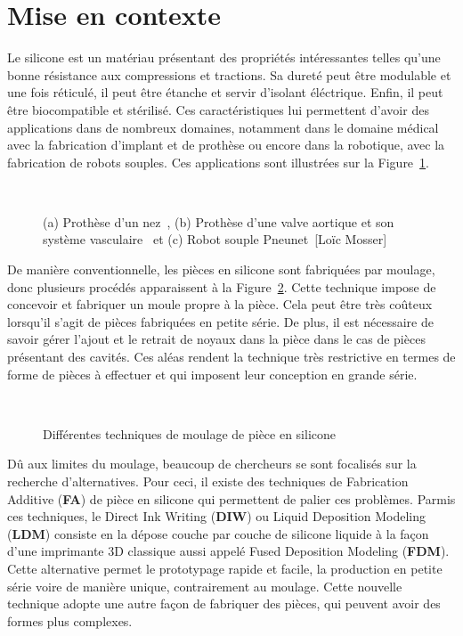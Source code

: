 \documentclass[11pt,a4paper]{article}
\begin{document}
\section*{Mise en contexte}
    Le silicone est un matériau présentant des propriétés intéressantes telles qu'une bonne résistance aux compressions et tractions. Sa dureté peut être modulable et une fois réticulé, il peut être étanche et servir d'isolant éléctrique. Enfin, il peut être biocompatible et stérilisé. Ces caractéristiques lui permettent d'avoir des applications dans de nombreux domaines, notamment dans le domaine médical avec la fabrication d'implant et de prothèse ou encore dans la robotique, avec la fabrication de robots souples. Ces applications sont illustrées sur la Figure~\ref{fig:applications}. 

    \begin{figure}[H]
        \centering
        \def\svgwidth{0.5\columnwidth}
        \caption{(a) Prothèse d'un nez~\cite{zare2021silicone}, (b) Prothèse d'une valve aortique et son système vasculaire~\cite{coulter2019bioinspired} et (c) Robot souple Pneunet~[Loïc Mosser]}~\label{fig:applications}
    \end{figure}
    
    De manière conventionnelle, les pièces en silicone sont fabriquées par moulage, donc plusieurs procédés apparaissent à la Figure~\ref{fig:moulage}. Cette technique impose de concevoir et fabriquer un moule propre à la pièce. Cela peut être très coûteux lorsqu'il s'agit de pièces fabriquées en petite série. De plus, il est nécessaire de savoir gérer l'ajout et le retrait de noyaux dans la pièce dans le cas de pièces présentant des cavités. Ces aléas rendent la technique très restrictive en termes de forme de pièces à effectuer et qui imposent leur conception en grande série.

    \begin{figure}[H]
        \centering
        \def\svgwidth{\columnwidth}
        \caption{Différentes techniques de moulage de pièce en silicone}~\label{fig:moulage}
    \end{figure}



    Dû aux limites du moulage, beaucoup de chercheurs se sont focalisés sur la recherche d'alternatives. Pour ceci, il existe des techniques de Fabrication Additive (\textbf{FA}) de pièce en silicone qui permettent de palier ces problèmes. Parmis ces techniques, le Direct Ink Writing (\textbf{DIW}) ou Liquid Deposition Modeling (\textbf{LDM}) consiste en la dépose couche par couche de silicone liquide à la façon d'une imprimante 3D classique aussi appelé Fused Deposition Modeling (\textbf{FDM}). Cette alternative permet le prototypage rapide et facile, la production en petite série voire de manière unique, contrairement au moulage. Cette nouvelle technique adopte une autre façon de fabriquer des pièces, qui peuvent avoir des formes plus complexes.  
\end{document}
